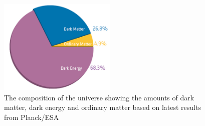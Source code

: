 \begin{figure}[hbtp]
   \centering
     \includegraphics[width=0.5\textwidth]{Chapters/03_Theory/Images/planck_cosmic_pie}\hfill
     \caption[The composition of the universe showing the amounts of dark matter, dark energy and ordinary
     matter.]{The composition of the universe showing the amounts of dark matter, dark energy and ordinary
     matter based on latest results from Planck/ESA~\cite{Ade:2013sjv}}
     \label{fig:universe_composition}
\end{figure}
